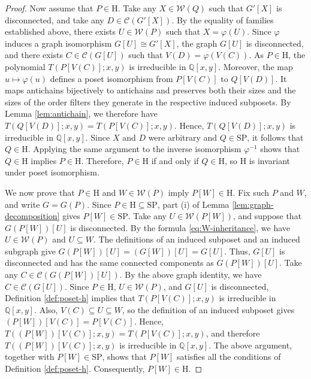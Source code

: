 \documentclass[10pt,a4paper]{amsart}
\begin{document}
\begin{proof}
Now assume that $P\in\mathrm H$.
Take any $X\in\mathcal W(Q)$ such that $G'[X]$ is disconnected,
and take any $D\in\mathcal C(G'[X])$.
By the equality of families established above,
there exists $U\in\mathcal W(P)$ such that $X=\varphi(U)$.
Since $\varphi$ induces a graph isomorphism
$G[U]\cong G'[X]$, the graph $G[U]$ is disconnected,
and there exists $C\in\mathcal C(G[U])$ such that
$V(D)=\varphi(V(C))$.
As $P\in\mathrm H$, the polynomial $T(P[V(C)];x,y)$
is irreducible in $\mathbb Q[x,y]$.
Moreover, the map $u\mapsto\varphi(u)$ defines a poset isomorphism
from $P[V(C)]$ to $Q[V(D)]$.
It maps antichains bijectively to antichains and preserves
both their sizes and the sizes of the order filters
they generate in the respective induced subposets.
By Lemma \ref{lem:antichain}, we therefore have
$T(Q[V(D)];x,y)=T(P[V(C)];x,y)$.
Hence, $T(Q[V(D)];x,y)$ is irreducible in $\mathbb Q[x,y]$.
Since $X$ and $D$ were arbitrary and $Q\in\mathrm{SP}$,
it follows that $Q\in\mathrm H$.
Applying the same argument to the inverse isomorphism $\varphi^{-1}$
shows that $Q\in\mathrm H$ implies $P\in\mathrm H$.
Therefore, $P\in\mathrm H$ if and only if $Q\in\mathrm H$,
so $\mathrm H$ is invariant under poset isomorphism.

We now prove that $P\in\mathrm H$ and $W\in\mathcal W(P)$
imply $P[W]\in\mathrm H$. Fix such $P$ and $W$, and write $G=G(P)$.
Since $P\in\mathrm H\subseteq\mathrm{SP}$,
part \textup{(i)} of Lemma \ref{lem:graph-decomposition} gives $P[W]\in\mathrm{SP}$.
Take any $U\in\mathcal W(P[W])$, and suppose that $G(P[W])[U]$ is disconnected.
By the formula \eqref{eq:W-inheritance}, we have $U\in\mathcal W(P)$ and $U\subseteq W$.
The definitions of an induced subposet and an induced subgraph give $G(P[W])[U]=(G[W])[U]=G[U]$.
Thus, $G[U]$ is disconnected and has the same connected components as $G(P[W])[U]$.
Take any $C\in\mathcal C(G(P[W])[U])$.
By the above graph identity, we have $C\in\mathcal C(G[U])$.
Since $P\in\mathrm H$, $U\in\mathcal W(P)$,
and $G[U]$ is disconnected, Definition \ref{def:poset-h}
implies that $T(P[V(C)];x,y)$ is irreducible in $\mathbb Q[x,y]$.
Also, $V(C)\subseteq U\subseteq W$, so the definition
of an induced subposet gives $(P[W])[V(C)]=P[V(C)]$.
Hence, $T((P[W])[V(C)];x,y)=T(P[V(C)];x,y)$,
and therefore $T((P[W])[V(C)];x,y)$ is irreducible in $\mathbb Q[x,y]$.
The above argument, together with $P[W]\in\mathrm{SP}$,
shows that $P[W]$ satisfies all the conditions of Definition \ref{def:poset-h}.
Consequently, $P[W]\in\mathrm H$.


\end{proof}
\end{document}
